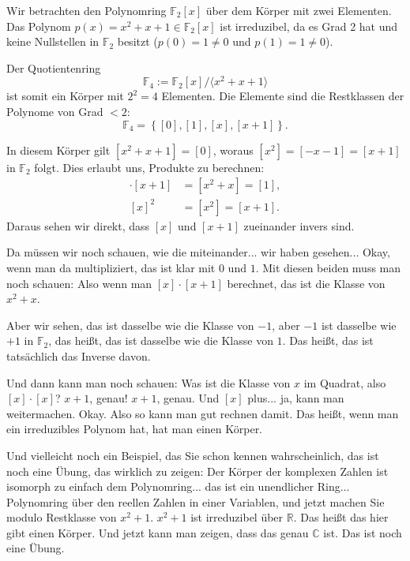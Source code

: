 \begin{math-stroke}
Wir betrachten den Polynomring $\mathbb{F}_2[x]$ über dem Körper mit zwei Elementen. Das Polynom $p(x) = x^2 + x + 1 \in \mathbb{F}_2[x]$ ist irreduzibel, da es Grad 2 hat und keine Nullstellen in $\mathbb{F}_2$ besitzt ($p(0)=1 \neq 0$ und $p(1)=1 \neq 0$).

Der Quotientenring
\[
\mathbb{F}_4 := \mathbb{F}_2[x]/\langle x^2 + x + 1 \rangle
\]
ist somit ein Körper mit $2^2 = 4$ Elementen. Die Elemente sind die Restklassen der Polynome von Grad $< 2$:
\[
\mathbb{F}_4 = \left\{ [0], [1], [x], [x+1] \right\}.
\]

\begin{explanation-of-steps}
In diesem Körper gilt $[x^2 + x + 1] = [0]$, woraus $[x^2] = [-x - 1] = [x + 1]$ in $\mathbb{F}_2$ folgt. Dies erlaubt uns, Produkte zu berechnen:
\begin{align*}
[x] \cdot [x+1] &= [x^2 + x] = [1], \\
[x]^2 &= [x^2] = [x + 1].
\end{align*}
Daraus sehen wir direkt, dass $[x]$ und $[x+1]$ zueinander invers sind.
\end{explanation-of-steps}
\end{math-stroke}

\begin{spoken-clean}[00:58:36 - 01:00:21]
Da müssen wir noch schauen, wie die miteinander... wir haben gesehen... Okay, wenn man da multipliziert, das ist klar mit $0$ und $1$. Mit diesen beiden muss man noch schauen: Also wenn man $[x] \cdot [x+1]$ berechnet, das ist die Klasse von $x^2 + x$.

Aber wir sehen, das ist dasselbe wie die Klasse von $-1$, aber $-1$ ist dasselbe wie $+1$ in $\mathbb{F}_2$, das heißt, das ist dasselbe wie die Klasse von $1$. Das heißt, das ist tatsächlich das Inverse davon.

Und dann kann man noch schauen: Was ist die Klasse von $x$ im Quadrat, also $[x] \cdot [x]$?  $x+1$, genau! $x+1$, genau. Und $[x]$ plus... ja, kann man weitermachen. Okay. Also so kann man gut rechnen damit. Das heißt, wenn man ein irreduzibles Polynom hat, hat man einen Körper.

Und vielleicht noch ein Beispiel, das Sie schon kennen wahrscheinlich, das ist noch eine Übung, das wirklich zu zeigen: Der Körper der komplexen Zahlen ist isomorph zu einfach dem Polynomring... das ist ein unendlicher Ring... Polynomring über den reellen Zahlen in einer Variablen, und jetzt machen Sie modulo Restklasse von $x^2 + 1$. $x^2 + 1$ ist irreduzibel über $\mathbb{R}$. Das heißt das hier gibt einen Körper. Und jetzt kann man zeigen, dass das genau $\mathbb{C}$ ist. Das ist noch eine Übung.
\end{spoken-clean}

